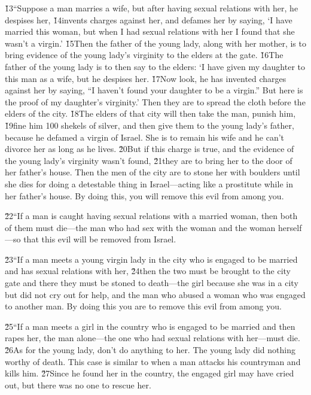 \v{13}``Suppose a man marries a wife, but after having sexual relations with her, he despises her, \v{14}invents charges against her, and defames her by saying, `I have married this woman, but when I had sexual relations with her I found that she wasn't a virgin.' \v{15}Then the father of the young lady, along with her mother, is to bring evidence of the young lady's virginity to the elders at the gate. \v{16}The father of the young lady is to then say to the elders: `I have given my daughter to this man as a wife, but he despises her. \v{17}Now look, he has invented charges against her by saying, ``I haven't found your daughter to be a virgin.'' But here is the proof of my daughter's virginity.' Then they are to spread the cloth before the elders of the city. \v{18}The elders of that city will then take the man, punish him, \v{19}fine him 100 shekels of silver, and then give them to the young lady's father, because he defamed a virgin of Israel. She is to remain his wife and he can't divorce her as long as he lives. \v{20}But if this charge is true, and the evidence of the young lady's virginity wasn't found, \v{21}they are to bring her to the door of her father's house. Then the men of the city are to stone her with boulders until she dies for doing a detestable thing in Israel---acting like a prostitute while in her father's house. By doing this, you will remove this evil from among you.

\v{22}``If a man is caught having sexual relations with a married woman, then both of them must die---the man who had sex with the woman and the woman herself---so that this evil will be removed from Israel.

\v{23}``If a man meets a young virgin lady in the city who is engaged to be married and has sexual relations with her, \v{24}then the two must be brought to the city gate and there they must be stoned to death---the girl because she was in a city but did not cry out for help, and the man who abused a woman who was engaged to another man. By doing this you are to remove this evil from among you.

\v{25}``If a man meets a girl in the country who is engaged to be married and then rapes her, the man alone---the one who had sexual relations with her---must die. \v{26}As for the young lady, don't do anything to her. The young lady did nothing worthy of death. This case is similar to when a man attacks his countryman and kills him. \v{27}Since he found her in the country, the engaged girl may have cried out, but there was no one to rescue her.

